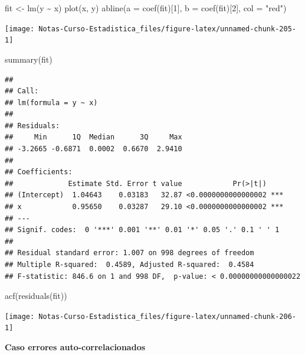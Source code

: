 \documentclass[
  12pt,
]{book}
\newenvironment{Shaded}{\begin{snugshade}}{\end{snugshade}}
\newcommand{\AttributeTok}[1]{\textcolor[rgb]{0.77,0.63,0.00}{#1}}
\newcommand{\DecValTok}[1]{\textcolor[rgb]{0.00,0.00,0.81}{#1}}
\newcommand{\FunctionTok}[1]{\textcolor[rgb]{0.00,0.00,0.00}{#1}}
\newcommand{\NormalTok}[1]{#1}
\newcommand{\OtherTok}[1]{\textcolor[rgb]{0.56,0.35,0.01}{#1}}
\newcommand{\SpecialCharTok}[1]{\textcolor[rgb]{0.00,0.00,0.00}{#1}}
\newcommand{\StringTok}[1]{\textcolor[rgb]{0.31,0.60,0.02}{#1}}
\theoremstyle{definition}
\theoremstyle{definition}
\theoremstyle{definition}
\theoremstyle{remark}
\begin{document}
\begin{Shaded}
\begin{Highlighting}[]
\NormalTok{fit }\OtherTok{\textless{}{-}} \FunctionTok{lm}\NormalTok{(y }\SpecialCharTok{\textasciitilde{}}\NormalTok{ x)}
\FunctionTok{plot}\NormalTok{(x, y)}
\FunctionTok{abline}\NormalTok{(}\AttributeTok{a =} \FunctionTok{coef}\NormalTok{(fit)[}\DecValTok{1}\NormalTok{], }\AttributeTok{b =} \FunctionTok{coef}\NormalTok{(fit)[}\DecValTok{2}\NormalTok{], }\AttributeTok{col =} \StringTok{"red"}\NormalTok{)}
\end{Highlighting}
\end{Shaded}

\begin{center}\texttt{[image: Notas-Curso-Estadistica\_files/figure-latex/unnamed-chunk-205-1]} \end{center}

\begin{Shaded}
\begin{Highlighting}[]
\FunctionTok{summary}\NormalTok{(fit)}
\end{Highlighting}
\end{Shaded}

\begin{verbatim}
## 
## Call:
## lm(formula = y ~ x)
## 
## Residuals:
##     Min      1Q  Median      3Q     Max 
## -3.2665 -0.6871  0.0002  0.6670  2.9410 
## 
## Coefficients:
##             Estimate Std. Error t value            Pr(>|t|)    
## (Intercept)  1.04643    0.03183   32.87 <0.0000000000000002 ***
## x            0.95650    0.03287   29.10 <0.0000000000000002 ***
## ---
## Signif. codes:  0 '***' 0.001 '**' 0.01 '*' 0.05 '.' 0.1 ' ' 1
## 
## Residual standard error: 1.007 on 998 degrees of freedom
## Multiple R-squared:  0.4589, Adjusted R-squared:  0.4584 
## F-statistic: 846.6 on 1 and 998 DF,  p-value: < 0.00000000000000022
\end{verbatim}

\begin{Shaded}
\begin{Highlighting}[]
\FunctionTok{acf}\NormalTok{(}\FunctionTok{residuals}\NormalTok{(fit))}
\end{Highlighting}
\end{Shaded}

\begin{center}\texttt{[image: Notas-Curso-Estadistica\_files/figure-latex/unnamed-chunk-206-1]} \end{center}

\textbf{Caso errores auto-correlacionados}
\end{document}
